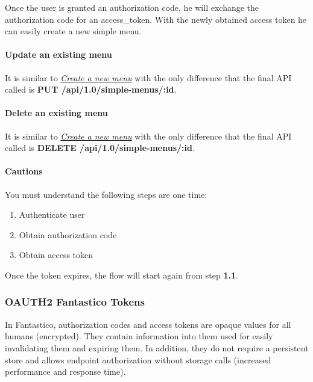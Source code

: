 \documentclass[letterpaper,10pt,english]{sphinxmanual}
\begin{document}
Once the user is granted an authorization code, he will exchange the authorization code for an access\_token. With the newly
obtained access token he can easily create a new simple menu.


\paragraph{Update an existing menu}
\label{features/oauth2/simple_api_example:update-an-existing-menu}
It is similar to {\hyperref[features/oauth2/simple_api_example:oauth-create-new-menu]{\emph{Create a new menu}}} with the only difference that the final API called is
\textbf{PUT /api/1.0/simple-menus/:id}.


\paragraph{Delete an existing menu}
\label{features/oauth2/simple_api_example:delete-an-existing-menu}
It is similar to {\hyperref[features/oauth2/simple_api_example:oauth-create-new-menu]{\emph{Create a new menu}}} with the only difference that the final API called is
\textbf{DELETE /api/1.0/simple-menus/:id}.


\paragraph{Cautions}
\label{features/oauth2/simple_api_example:cautions}
You must understand the following steps are one time:
\begin{enumerate}
\item {} 
Authenticate user

\item {} 
Obtain authorization code

\item {} 
Obtain access token

\end{enumerate}

Once the token expires, the flow will start again from step \textbf{1.1}.


\subsubsection{OAUTH2 Fantastico Tokens}
\label{features/oauth2/tokens_format:oauth2-fantastico-tokens}\label{features/oauth2/tokens_format::doc}
In Fantastico, authorization codes and access tokens are opaque values for all humans (encrypted). They contain information into
them used for easily invalidating them and expiring them. In addition, they do not require a persistent store and allows
endpoint authorization without storage calls (increased performance and response time).
\end{document}
